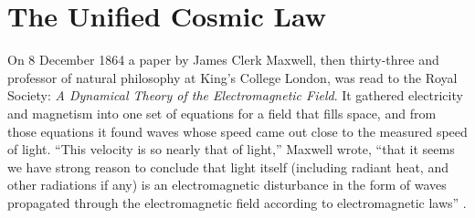 \makeatletter
{}
\makeatother
\providecommand{\Com}{\operatorname{Com}}
\providecommand{\Sh}{\operatorname{Sh}}
\newcommand{\uE}{\boldsymbol{\mathcal{E}}}   %
\newcommand{\uB}{\boldsymbol{\mathcal{B}}}   %
\newcommand{\cosA}{\boldsymbol{\mathcal{A}}}   %
\newcommand{\vv}{\mathbf{v}}
\newcommand{\vg}{\mathbf{g}}
\newcommand{\vE}{\mathbf{E}}
\newcommand{\vB}{\mathbf{B}}
\newcommand{\vJ}{\mathbf{J}}
\newcommand{\ve}{\mathbf{e}}
\newcommand{\vb}{\mathbf{b}}
\newcommand{\vx}{\mathbf{x}}
\newcommand{\vS}{\mathbf{S}}
\newcommand{\vF}{\mathbf{F}}
\newcommand{\vH}{\mathbf{H}}
\newcommand{\vf}{\mathbf{f}}
\newcommand{\vp}{\mathbf{p}}
\newcommand{\vL}{\mathbf{L}}
\newcommand{\rhat}{\hat{\mathbf{r}}}
\chapter{The Unified Cosmic Law}\label{ch:unified}



On 8 December 1864 a paper by James Clerk Maxwell, then thirty-three and professor of natural philosophy at King's College London, was read to the Royal Society: \emph{A Dynamical Theory of the Electromagnetic Field}. It gathered electricity and magnetism into one set of equations for a field that fills space, and from those equations it found waves whose speed came out close to the measured speed of light. \enquote{This velocity is so nearly that of light,} Maxwell wrote, \enquote{that it seems we have strong reason to conclude that light itself (including radiant heat, and other radiations if any) is an electromagnetic disturbance in the form of waves propagated through the electromagnetic field according to electromagnetic laws} \citep{Maxwell1865}.

